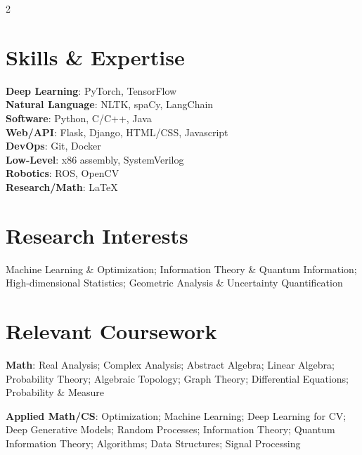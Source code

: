 \documentclass[letterpaper,10pt]{article}
\begin{document}
\setlength{\columnsep}{1.15cm}
\begin{paracol}{2}
    
    
    \section{Skills \& Expertise}
    \textbf{Deep Learning}: PyTorch, TensorFlow\\
    \textbf{Natural Language}: NLTK, spaCy, LangChain\\
    \textbf{Software}: Python, C/C++, Java\\
    \textbf{Web/API}: Flask, Django, HTML/CSS, Javascript\\
    \textbf{DevOps}: Git, Docker\\
    \textbf{Low-Level}: x86 assembly, SystemVerilog\\
    \textbf{Robotics}: ROS, OpenCV\\
    \textbf{Research/Math}: \LaTeX\\
    
    \vspace{-10pt}
    
    \section{Research Interests}
    Machine Learning \& Optimization; Information Theory \& Quantum Information; High-dimensional Statistics; Geometric Analysis \& Uncertainty Quantification \\
    
    \vspace{-10pt}
    
    \section{Relevant Coursework}
    \raggedright\textbf{Math}: Real Analysis; Complex Analysis; Abstract Algebra; Linear Algebra; Probability Theory; Algebraic Topology; Graph Theory; Differential Equations; Probability \& Measure \\
    \vspace{10pt}
    \raggedright\textbf{Applied Math/CS}: Optimization; Machine Learning; Deep Learning for CV; Deep Generative Models; Random Processes; Information Theory; Quantum Information Theory; Algorithms; Data Structures; Signal Processing \\
    

\end{paracol}
\end{document}
